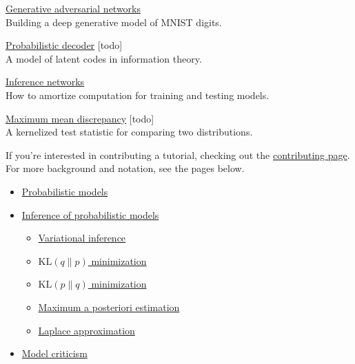 
\href{gan}{Generative adversarial networks} \\
Building a deep generative model of MNIST digits.

\href{decoder}{Probabilistic decoder} [todo] \\
A model of latent codes in information theory.

\href{inference-networks}{Inference networks} \\
How to amortize computation for training and testing models.

\href{mmd}{Maximum mean discrepancy} [todo] \\
A kernelized test statistic for comparing two distributions.



If you're interested in contributing a tutorial, checking out the
\href{/contributing}{contributing page}.
For more background and notation, see the pages below.
\begin{itemize}
  \item \href{model}{Probabilistic models}
  \item \href{inference}{Inference of probabilistic models}
  \begin{itemize}
   \item \href{variational-inference}{Variational inference}
   \item \href{klqp}{$\text{KL}(q\|p)$ minimization}
   \item \href{klpq}{$\text{KL}(p\|q)$ minimization}
   \item \href{map}{Maximum a posteriori estimation}
   \item \href{map-laplace}{Laplace approximation}
  \end{itemize}
  \item \href{criticism}{Model criticism}
\end{itemize}
